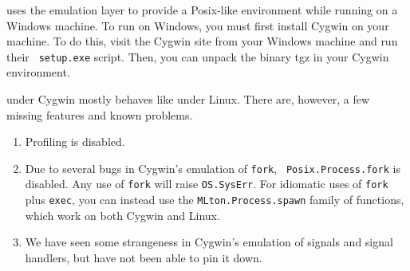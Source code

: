 
{\mlton} uses the  emulation
layer to provide a Posix-like environment while running on a Windows machine.
To run {\mlton} on Windows, you must first install Cygwin on your machine.  To
do this, visit the Cygwin site from your Windows machine and run their {\tt
setup.exe} script.  Then, you can unpack the {\mlton} binary tgz in your Cygwin
environment.

{\mlton} under Cygwin mostly behaves like {\mlton} under Linux.  There are,
however, a few missing features and known problems.

\begin{enumerate}

\item Profiling is disabled.

\item Due to several bugs in Cygwin's emulation of {\tt fork}, {\tt
Posix.Process.fork} is disabled.  Any use of {\tt fork} will raise
{\tt OS.SysErr}.  For idiomatic uses of {\tt fork} plus {\tt exec},
you can instead use the {\tt MLton.Process.spawn} family of functions, which
work on both Cygwin and Linux.

\item We have seen some strangeness in Cygwin's emulation of signals and
signal handlers, but have not been able to pin it down.

\end{enumerate}


